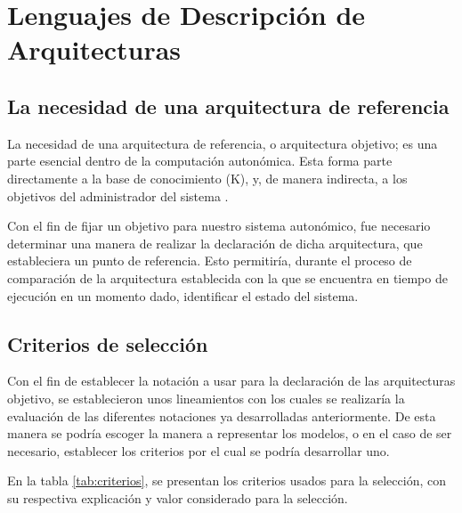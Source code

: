 \chapter{Lenguajes de Descripción de Arquitecturas}

\section{La necesidad de una arquitectura de referencia}

La necesidad de una arquitectura de referencia, o arquitectura objetivo; es una parte esencial dentro de la computación autonómica. Esta forma parte directamente a la base de conocimiento (K), y, de manera indirecta, a los objetivos del administrador del sistema \cite[p. 24]{lalanda_diaconescu_mccann_2014}. 

Con el fin de fijar un objetivo para nuestro sistema autonómico, fue necesario determinar una manera de realizar la declaración de dicha arquitectura, que estableciera un punto de referencia. Esto permitiría, durante el proceso de comparación de la arquitectura establecida con la que se encuentra en tiempo de ejecución en un momento dado, identificar el estado del sistema.

\section{Criterios de selección}

Con el fin de establecer la notación a usar para la declaración de las arquitecturas objetivo, se establecieron unos lineamientos con los cuales se realizaría la evaluación de las diferentes notaciones ya desarrolladas anteriormente. De esta manera se podría escoger la manera a representar los modelos, o en el caso de ser necesario, establecer los criterios por el cual se podría desarrollar uno.

En la tabla \ref{tab:criterios}, se presentan los criterios usados para la selección, con su respectiva explicación y valor considerado para la selección.

